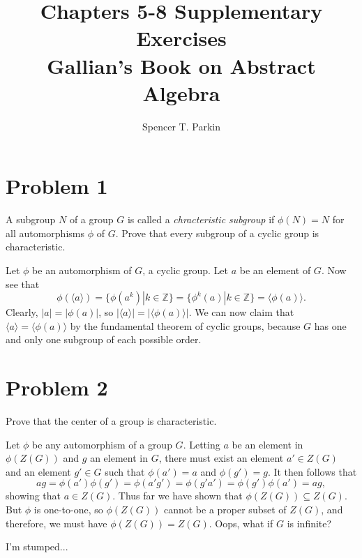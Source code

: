 \documentclass[12pt]{article}
\title{Chapters 5-8 Supplementary Exercises\\Gallian's Book on Abstract Algebra}
\author{Spencer T. Parkin}
\newcommand{\Z}{\mathbb{Z}}
\begin{document}
\maketitle

\section*{Problem 1}

A subgroup $N$ of a group $G$ is called a {\it chracteristic subgroup} if $\phi(N)=N$
for all automorphisms $\phi$ of $G$.  Prove that every subgroup of a cyclic group is characteristic.

Let $\phi$ be an automorphism of $G$, a cyclic group.
Let $a$ be an element of $G$.  Now see that
\begin{equation*}
\phi(\langle a\rangle)=\{\phi(a^k)|k\in\Z\}=\{\phi^k(a)|k\in\Z\}=\langle\phi(a)\rangle.
\end{equation*}
Clearly, $|a|=|\phi(a)|$, so $|\langle a\rangle|=|\langle\phi(a)\rangle|$.  We can
now claim that $\langle a\rangle=\langle \phi(a)\rangle$ by the fundamental
theorem of cyclic groups, because $G$ has one and only one subgroup of each
possible order.

\section*{Problem 2}

Prove that the center of a group is characteristic.

Let $\phi$ be any automorphism of a group $G$.
Letting $a$ be an element in $\phi(Z(G))$ and $g$ an element in $G$,
there must exist an element $a'\in Z(G)$ and an element $g'\in G$ such
that $\phi(a')=a$ and $\phi(g')=g$.  It then follows that
\begin{equation*}
ag=\phi(a')\phi(g')=\phi(a'g')=\phi(g'a')=\phi(g')\phi(a')=ag,
\end{equation*}
showing that $a\in Z(G)$.
Thus far we have shown that $\phi(Z(G))\subseteq Z(G)$.
But $\phi$ is one-to-one, so $\phi(Z(G))$ cannot be a proper
subset of $Z(G)$, and therefore, we must have $\phi(Z(G))=Z(G)$.
Oops, what if $G$ is infinite?

I'm stumped...
\end{document}
